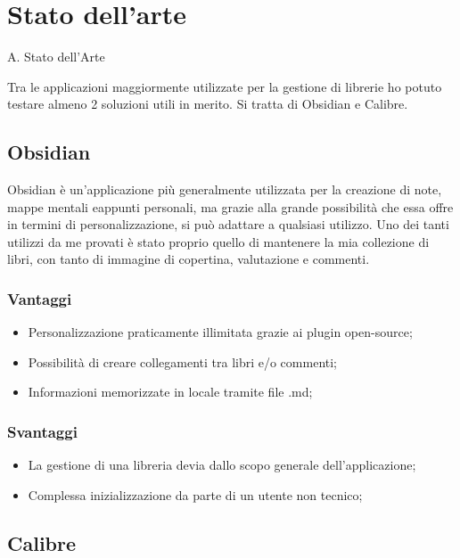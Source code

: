 \documentclass[a4paper,12pt]{report}
\begin{document}
\section{Stato dell'arte}

A. Stato dell'Arte

Tra le applicazioni maggiormente utilizzate per la gestione di librerie
ho potuto testare almeno 2 soluzioni utili in merito. Si tratta di
Obsidian e Calibre.

\subsection{Obsidian}\label{obsidian}

Obsidian è un'applicazione più generalmente utilizzata per la creazione
di note, mappe mentali eappunti personali, ma grazie alla grande
possibilità che essa offre in termini di personalizzazione, si può
adattare a qualsiasi utilizzo. Uno dei tanti utilizzi da me provati è
stato proprio quello di mantenere la mia collezione di libri, con tanto
di immagine di copertina, valutazione e commenti.

\subsubsection{Vantaggi}\label{vantaggi}

\begin{itemize}
  \item
    Personalizzazione praticamente illimitata grazie ai plugin
    open-source;
  \item
    Possibilità di creare collegamenti tra libri e/o commenti;
  \item
    Informazioni memorizzate in locale tramite file .md;
\end{itemize}

\subsubsection{Svantaggi}\label{svantaggi}

\begin{itemize}
  \item
    La gestione di una libreria devia dallo scopo generale
    dell'applicazione;
  \item
    Complessa inizializzazione da parte di un utente non tecnico;
\end{itemize}

\subsection{Calibre}\label{calibre}
\end{document}
